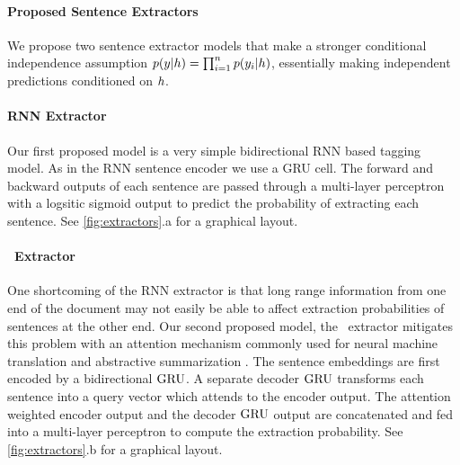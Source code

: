 \paragraph{Proposed Sentence Extractors}
We propose two sentence extractor models that 
make a stronger conditional independence 
assumption $p(\slabel|\sentEmb)=\prod_{i=1}^\docSize p(\slabel[i]|\sentEmb)$,
essentially making independent predictions conditioned on $\sentEmb$.

\paragraph{RNN Extractor}
    Our first proposed model is a very simple bidirectional
RNN based tagging model. As in the RNN sentence encoder we use a GRU cell.
The forward and backward outputs of each sentence are passed through a 
multi-layer perceptron with a logsitic sigmoid output 
to predict the probability
of extracting each sentence. 
See \autoref{fig:extractors}.a for a graphical layout.


\paragraph{\sts~Extractor} One shortcoming of the RNN extractor is that long range
information from one end of the document may not easily be able to affect 
extraction probabilities of sentences at the other end. 
Our second proposed model, the \sts~extractor mitigates this problem with an 
attention 
mechanism commonly
used for neural machine translation \cite{bahdanau2014neural} and 
abstractive summarization \cite{see2017get}. 
The sentence embeddings are first
encoded by a bidirectional $\operatorname{GRU}$. A separate decoder $\operatorname{GRU}$ transforms each 
sentence into a query vector which attends to the encoder output. The
attention weighted encoder output and the decoder $\operatorname{GRU}$ output are concatenated
and fed into a multi-layer perceptron to compute the extraction probability.
See \autoref{fig:extractors}.b for a graphical layout.


